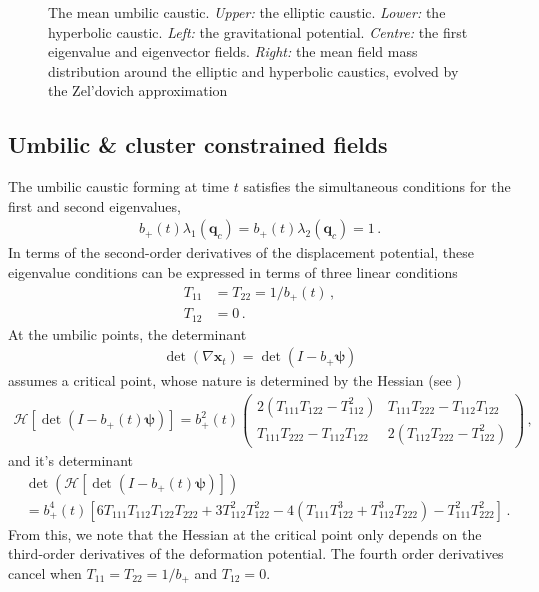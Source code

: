 \documentclass[a4paper, 11pt]{article}
\begin{document}
\begin{figure}
\begin{subfigure}[b]{0.32\textwidth}
\end{subfigure}
\caption{The mean umbilic caustic. \textit{Upper:} the  elliptic caustic. \textit{Lower:} the hyperbolic caustic. \textit{Left:} the gravitational potential. \textit{Centre:} the first eigenvalue and eigenvector fields. \textit{Right:} the mean field mass distribution around the elliptic and hyperbolic caustics, evolved by the Zel'dovich approximation}\label{fig:meanHyperbolic}
\end{figure}


\subsection{Umbilic \& cluster constrained fields}
The umbilic caustic forming at time $t$ satisfies the simultaneous conditions for the first and second eigenvalues,  
\begin{align}
b_+(t) \lambda_1(\bm{q}_c) = b_+(t) \lambda_2(\bm{q}_c) = 1\,.
\end{align}
In terms of the second-order derivatives of the displacement potential, these eigenvalue conditions can be expressed in terms of three linear conditions
\begin{align}
T_{11}&=T_{22}=1/b_+(t)\,,\\
T_{12}&=0\,.
\end{align}
At the umbilic points, the determinant 
\begin{align}
\det(\nabla \bm{x}_t) = \det (I- b_+ \bm{\psi})
\end{align}
assumes a critical point, whose nature is determined by the Hessian (see \cite{Rozhanskii:1984})
\begin{align}
\mathcal{H}\left[\det (I- b_+(t) \bm{\psi})\right] =
b_+^2(t)\begin{pmatrix} 
2(T_{111}T_{122} -T_{112}^2) & T_{111}T_{222}-T_{112}T_{122} \\
T_{111}T_{222}-T_{112}T_{122} & 2(T_{112}T_{222}-T_{122}^2)
\end{pmatrix}\,,
\end{align}
and it's determinant
\begin{align}
&\det\left( \mathcal{H}\left[\det (I- b_+(t) \bm{\psi})\right]\right) \nonumber\\
&=b_+^4(t)\left[
 6 T_{111} T_{112} T_{122} T_{222} + 3 T_{112}^2 T_{122}^2  - 4 (T_{111} T_{122}^3 + T_{112}^3 T_{222})  - T_{111}^2 T_{222}^2\right]\,.
\end{align}
From this, we note that the Hessian at the critical point only depends on the third-order derivatives of the deformation potential. The fourth order derivatives cancel when $T_{11}=T_{22}=1/b_+$ and $T_{12}=0$.
\end{document}
